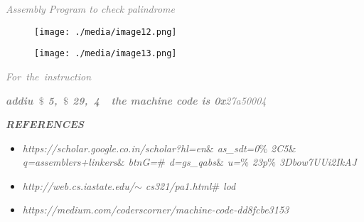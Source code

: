 \documentclass[12pt]{article}
\begin{document}
\textit{\textcolor[HTML]{7F7F7F}{Assembly Program to check palindrome }}\par




\begin{figure}[H]
	\begin{Center}
		\texttt{[image: ./media/image12.png]}
	\end{Center}
\end{figure}



\par




\begin{figure}[H]
	\begin{Center}
		\texttt{[image: ./media/image13.png]}
	\end{Center}
\end{figure}



\par

\textit{\textcolor[HTML]{7F7F7F}{For\ the\ instruction\ \ \ \ \ \ \ \ \    }}{\fontsize{10pt}{12.0pt}\selectfont \textbf{\textit{\textcolor[HTML]{7F7F7F}{addiu\ $\$$ 5,\ $\$$ 29,\ 4\ \  the machine code  is   0x}}}\textit{\textcolor[HTML]{7F7F7F}{27a50004}}\par}\par


\vspace{\baselineskip}
{\fontsize{24pt}{28.8pt}\selectfont \textbf{\textit{\textcolor[HTML]{525252}{REFERENCES}}}\par}\par

\begin{itemize}
	\item \textit{\textcolor[HTML]{525252}{https://scholar.google.co.in/scholar?hl=en$\&$ as\_sdt=0$\%$ 2C5$\&$ q=assemblers+linkers$\&$ btnG=$\#$ d=gs\_qabs$\&$ u=$\%$ 23p$\%$ 3Dbow7UUi2IkAJ}}\par

	\item {\fontsize{14pt}{16.8pt}\selectfont \textit{\textcolor[HTML]{525252}{http://web.cs.iastate.edu/$ \sim $ cs321/pa1.html$\#$ lod}}\par}\par

	\item {\fontsize{14pt}{16.8pt}\selectfont \textit{\textcolor[HTML]{525252}{https://medium.com/coderscorner/machine-code-dd8fcbe3153}}\par}
\end{itemize}\par
\end{document}
